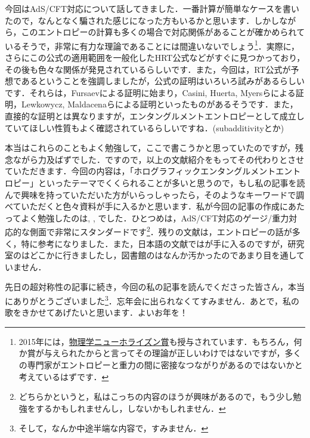 \documentclass[a4paper,uplatex,dvipdfmx]{jsarticle}
\theoremstyle{definition}
\begin{document}
今回はAdS/CFT対応について話してきました．一番計算が簡単なケースを書いたので，なんとなく騙された感じになった方もいるかと思います．しかしながら，このエントロピーの計算も多くの場合で対応関係があることが確かめられているそうで，非常に有力な理論であることには間違いないでしょう\footnote{
  2015年には，\href{https://breakthroughprize.org/Laureates/1/P2/Y2015}{物理学ニューホライズン賞}も授与されています．もちろん，何か賞が与えられたからと言ってその理論が正しいわけではないですが，多くの専門家がエントロピーと重力の間に密接なつながりがあるのではないかと考えているはずです．
}．実際に，さらにこの公式の適用範囲を一般化したHRT公式\cite{Hubeny_CovariantHolographic_2007}などがすぐに見つかっており，その後も色々な関係が発見されているらしいです．また，今回は，RT公式が予想であるということを強調しましたが，公式の証明はいろいろ試みがあるらしいです．それらは，Fursaevによる証明\cite{Fursaev_ProofHolographic_2006}に始まり，Casini, Huerta, Myersらによる証明\cite{Casini_DerivationHolographic_2011}，Lewkowycz, Maldacenaらによる証明\cite{Lewkowycz_GeneralizedGravitational_2013}といったものがあるそうです．また，直接的な証明とは異なりますが，エンタングルメントエントロピーとして成立していてほしい性質もよく確認されているらしいですね．(subadditivityとか)

本当はこれらのこともよく勉強して，ここで書こうかと思っていたのですが，残念ながら力及ばずでした．ですので，以上の文献紹介をもってその代わりとさせていただきます．今回の内容は，「ホログラフィックエンタングルメントエントロピー」といったテーマでくくられることが多いと思うので，もし私の記事を読んで興味を持っていただいた方がいらっしゃったら，そのようなキーワードで調べていただくと色々資料が手に入るかと思います．私が今回の記事の作成にあたってよく勉強したのは\cite{Ammon_GaugeGravity_2015}, \cite{Headrick_LecturesEntanglement_2019}, \cite{Rangamani_HolographicEntanglement_2017}でした．ひとつめは，AdS/CFT対応のゲージ/重力対応的な側面で非常にスタンダードです\footnote{
  どちらかというと，私はこっちの内容のほうが興味があるので，もう少し勉強をするかもしれませんし，しないかもしれません．
}．残りの文献は，エントロピーの話が多く，特に参考になりました．また，日本語の文献では\cite{高柳_ホロ_2014}が手に入るのですが，研究室のはどこかに行きましたし，図書館のはなんか汚かったのであまり目を通していません．

先日の超対称性の記事に続き，今回の私の記事を読んでくださった皆さん，本当にありがとうございました\footnote{
  そして，なんか中途半端な内容で，すみません．
}．忘年会に出られなくてすみません．あとで，私の歌をきかせてあげたいと思います．よいお年を！




\end{document}
